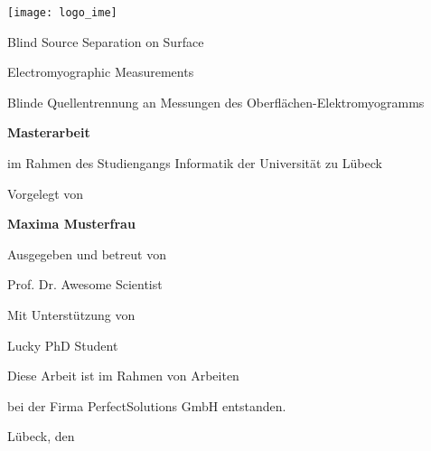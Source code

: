 \begin{titlepage}

  \texttt{[image: logo\_ime]}

  \vspace{0.8cm}

  \begin{center}

    \LARGE
    Blind Source Separation on Surface

    Electromyographic Measurements

    \vspace{1cm}

    \Large

    Blinde Quellentrennung an Messungen des Oberflächen-Elektromyogramms

    \vspace{0.8cm}

    \large

    \textbf{Masterarbeit} 

    im Rahmen des Studiengangs Informatik der Universität zu Lübeck

    \vspace{0.8cm}
    
    Vorgelegt von

    \textbf{Maxima Musterfrau}

    \vspace{0.8cm}

    Ausgegeben und betreut von

    Prof. Dr. Awesome Scientist

    \vspace{0.8cm}

    Mit Unterstützung von

    Lucky PhD Student

    \vspace{0.8cm}

    Diese Arbeit ist im Rahmen von Arbeiten 

    bei der Firma PerfectSolutions GmbH entstanden.
    
    \vspace{1.3cm}

    Lübeck, den \submitdate

  \end{center}

\end{titlepage}

